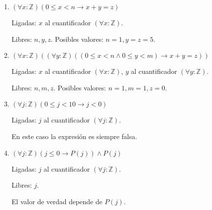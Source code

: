 \begin{enumerate}[label=\alph*)]
    \item $(\forall x: \mathbb{Z})(0 \leq x < n \to x + y = z)$

          Ligadas: $x$ al cuantificador $(\forall x: \mathbb{Z})$.

          Libres: $n, y, z$. Posibles valores: $n = 1, y = z = 5$.

    \item $(\forall x: \mathbb{Z})((\forall y: \mathbb{Z})((0 \leq x < n \land 0 \leq y < m) \to x + y = z))$

          Ligadas: $x$ al cuantificador $(\forall x: \mathbb{Z})$, $y$ al cuantificador $(\forall y: \mathbb{Z})$.

          Libres: $n, m, z$. Posibles valores: $n = 1, m = 1, z = 0$.

    \item $(\forall j: \mathbb{Z})(0 \leq j < 10 \to j < 0)$

          Ligadas: $j$ al cuantificador $(\forall j: \mathbb{Z})$.

          En este caso la expresión es siempre falsa.

    \item $(\forall j: \mathbb{Z})(j \leq 0 \to P(j)) \land P(j)$

          Ligadas: $j$ al cuantificador $(\forall j: \mathbb{Z})$.

          Libres: $j$.

          El valor de verdad depende de $P(j)$.
\end{enumerate}


